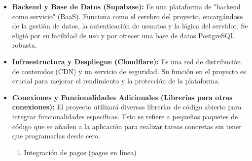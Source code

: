 \begin{itemize}
	\item \textbf{Backend y Base de Datos (Supabase):}  Es una plataforma de "backend como servicio" (BaaS). Funciona como el cerebro del proyecto, encargándose de la gestión de datos, la autenticación de usuarios y la lógica del servidor. Se eligió por su facilidad de uso y por ofrecer una base de datos PostgreSQL robusta.
	
\end{itemize}
\begin{itemize}
	\item \textbf{ Infraestructura y Despliegue (Cloudflare):}  Es una red de distribución de contenidos (CDN) y un servicio de seguridad. Su función en el proyecto es crucial para mejorar el rendimiento y la protección de la plataforma.
	
\end{itemize}

\begin{itemize}
	\item \textbf{ Conexiones y Funcionalidades Adicionales (Librerías para otras conexiones):}  El proyecto utilizará diversas librerías de código abierto para integrar funcionalidades específicas. Esto se refiere a pequeños paquetes de código que se añaden a la aplicación para realizar tareas concretas sin tener que programarlas desde cero.
	\begin{enumerate}
		\item Integración de pagos (pagos en línea) 
	\end{enumerate}

\end{itemize}




